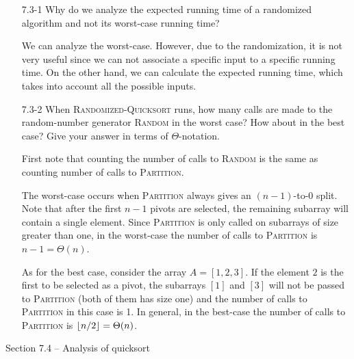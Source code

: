 \begin{enumerate}

\item[7.3{-}1]{Why do we analyze the expected running time of a randomized
algorithm and not its worst-case running time?}

\begin{framed}
We can analyze the worst-case. However, due to the randomization, it is not very
useful since we can not associate a specific input to a specific running time.
On the other hand, we can calculate the expected running time, which takes into
account all the possible inputs.
\end{framed}

\item[7.3{-}2]{When \textsc{Randomized-Quicksort} runs, how many calls are made
to the random-number generator \textsc{Random} in the worst case? How about in the
best case? Give your answer in terms of $\Theta$-notation.}

\begin{framed}
First note that counting the number of calls to \textsc{Random} is the same as
counting number of calls to \textsc{Partition}.

The worst-case occurs when \textsc{Partition} always gives an $(n - 1)$-to-0
split. Note that after the first $n - 1$ pivots are selected, the remaining
subarray will contain a single element. Since \textsc{Partition} is only called
on subarrays of size greater than one, in the worst-case the number of calls to
\textsc{Partition} is $n - 1 = \Theta(n)$.

As for the best case, consider the array $A = [1, 2, 3]$. If the element $2$ is
the first to be selected as a pivot, the subarrays $[1]$ and $[3]$ will not be
passed to \textsc{Partition} (both of them has size one) and the number of calls
to \textsc{Partition} in this case is 1. In general, in the best-case the number
of calls to \textsc{Partition} is $\lfloor n/2\rfloor = \Theta(n)$.
\end{framed}

\end{enumerate}

\newpage

{\large Section 7.4 {--} Analysis of quicksort}

